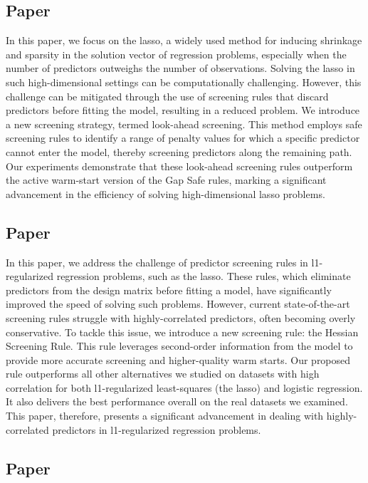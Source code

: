 \documentclass{book}
\begin{document}
\subsection{Paper \II}

In this paper, we focus on the lasso, a widely used method for inducing shrinkage and sparsity in the solution vector of regression problems, especially when the number of predictors outweighs the number of observations. Solving the lasso in such high-dimensional settings can be computationally challenging. However, this challenge can be mitigated through the use of screening rules that discard predictors before fitting the model, resulting in a reduced problem. We introduce a new screening strategy, termed look-ahead screening. This method employs safe screening rules to identify a range of penalty values for which a specific predictor cannot enter the model, thereby screening predictors along the remaining path. Our experiments demonstrate that these look-ahead screening rules outperform the active warm-start version of the Gap Safe rules, marking a significant advancement in the efficiency of solving high-dimensional lasso problems.

\subsection{Paper \III}

In this paper, we address the challenge of predictor screening rules in l1-regularized regression problems, such as the lasso. These rules, which eliminate predictors from the design matrix before fitting a model, have significantly improved the speed of solving such problems. However, current state-of-the-art screening rules struggle with highly-correlated predictors, often becoming overly conservative. To tackle this issue, we introduce a new screening rule: the Hessian Screening Rule. This rule leverages second-order information from the model to provide more accurate screening and higher-quality warm starts. Our proposed rule outperforms all other alternatives we studied on datasets with high correlation for both l1-regularized least-squares (the lasso) and logistic regression. It also delivers the best performance overall on the real datasets we examined. This paper, therefore, presents a significant advancement in dealing with highly-correlated predictors in l1-regularized regression problems.

\subsection{Paper \IV}
\end{document}
